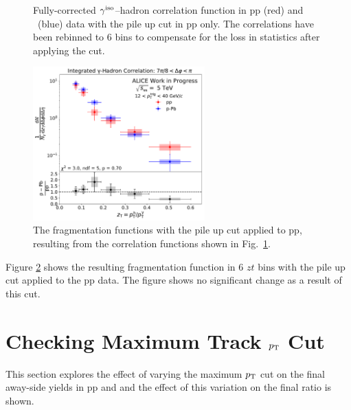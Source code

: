 \begin{figure}
\caption{Fully-corrected $\gamma^\mathrm{iso}$--hadron correlation function in pp (red) and \pPb~(blue) data with the pile up cut in pp only. The correlations have been rebinned to 6 \zt bins to compensate for the loss in statistics after applying the cut.}
\label{fig:Correlation_pileup}
\end{figure}

\begin{figure}
\centering
\includegraphics[width=0.59\textwidth]{G-H_New/zT_Rebin_6_006zT06zTpileCut/Final_FFunction_and_Ratio.pdf}
\caption{The fragmentation functions with the pile up cut applied to pp, resulting from the correlation functions shown in Fig.~\ref{fig:Correlation_pileup}.}
\label{fig:FF_pileup}
\end{figure}


Figure \ref{fig:FF_pileup} shows the resulting fragmentation function in 6 $zt$ bins with the pile up cut applied to the pp data. The figure shows no significant change as a result of this cut.


\section{Checking Maximum Track $p_{\mathrm{T}}$ Cut}
This section explores the effect of varying the maximum $p_{\mathrm{T}}$ cut on the final away-side yields in pp and \pPb and the effect of this variation on the final ratio is shown.

